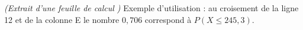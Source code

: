 \begin{center}
\end{center}

\textit{(Extrait d'une feuille de calcul )}
Exemple d'utilisation : au croisement de la ligne 12 et de la colonne E le nombre $0,706$ correspond à $P\left(X\leqslant  245,3\right)$.
